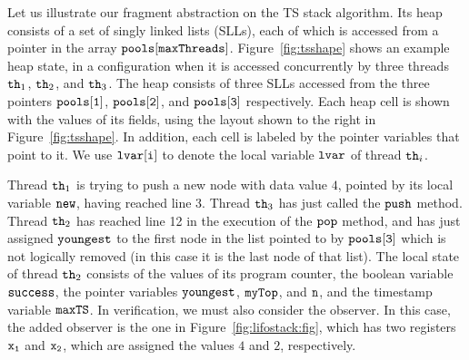 Let us illustrate our fragment abstraction on the TS stack algorithm.
Its heap consists of a set of singly linked lists (SLLs), each of which
is accessed from a pointer in the array ${\tt pools[maxThreads]}$.
Figure~\ref{fig:tsshape} shows an example heap state,
in a configuration when %
it is accessed concurrently by three threads ${\tt th}_1$, ${\tt th}_2$, and ${\tt th}_3$. The heap consists of three SLLs accessed from the three pointers $\tt pools[1]$, $\tt pools[2]$, and $\tt pools[3]$ respectively. Each heap cell is
shown with the values of its fields, using the layout shown to the right in
Figure~\ref{fig:tsshape}.
In addition, each cell is labeled by the
pointer variables that point to it. We use ${\tt lvar[i]}$ to denote the local
variable ${\tt lvar}$ of thread ${\tt th}_i$.

Thread ${\tt th}_1$ is trying to push a new node with data value $4$, pointed by its local variable $\tt new$, having reached line 3.
Thread ${\tt th}_3$ has just called the ${\tt push}$ method.
Thread ${\tt th}_2$ has reached line 12 in the execution of the ${\tt pop}$ method,  and has just assigned ${\tt youngest}$ to the first node in the list
pointed to by $\tt pools[3]$ which is not logically removed (in this case it is the last node of that list).
The local state of thread ${\tt th}_2$
consists of the values of its program counter, the boolean variable ${\tt success}$, the pointer variables ${\tt youngest}$, ${\tt myTop}$, and ${\tt n}$,
and the timestamp variable ${\tt maxTS}$.
In verification, we must also consider the observer. In this case, the added
observer is the one in Figure~\ref{fig:lifostack:fig}, which has two registers
$\tt x_1$ and $\tt x_2$, which are assigned the values $4$ and $2$,
respectively.

